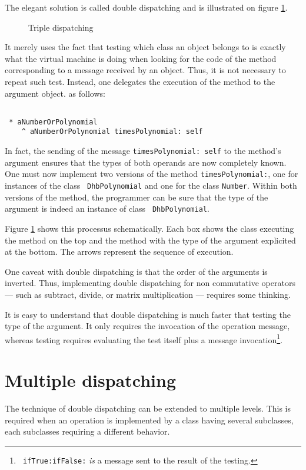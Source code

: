 \documentclass[twoside]{book}
\begin{document}
The elegant solution is called double dispatching and is
illustrated on figure \ref{fig:doubledispatch}.
\begin{figure}
\center{}
\caption{Triple dispatching}\label{fig:doubledispatch}
\end{figure}
It merely uses the fact that testing which class an object belongs
to is exactly what the virtual machine is doing when looking for
the code of the method corresponding to a message received by an
object. Thus, it is not necessary to repeat such test. Instead,
one delegates the execution of the method to the argument object.
as follows:
\begin{codeExample}
\begin{verbatim}

 * aNumberOrPolynomial
    ^ aNumberOrPolynomial timesPolynomial: self
\end{verbatim}
\end{codeExample}
In fact, the sending of the message {\tt timesPolynomial: self} to
the method's argument ensures that the types of both operands are
now completely known. One must now implement two versions of the
method {\tt timesPolynomial:}, one for instances of the class {\tt
DhbPolynomial} and one for the class {\tt Number}. Within both
versions of the method, the programmer can be sure that the type
of the argument is indeed an instance of class {\tt
DhbPolynomial}.

Figure \ref{fig:doubledispatch} shows this processus
schematically. Each box shows the class executing the method on
the top and the method with the type of the argument explicited at
the bottom. The arrows represent the sequence of execution.

One caveat with double dispatching is that the order of the
arguments is inverted. Thus, implementing double dispatching for
non commutative operators --- such as subtract, divide, or matrix
multiplication --- requires some thinking.

It is easy to understand that double dispatching is much faster
that testing the type of the argument. It only requires the
invocation of the operation message, whereas testing requires
evaluating the test itself plus a message invocation\footnote{{\tt
ifTrue:ifFalse:} {\it is} a message sent to the result of the
testing.}.

\section{Multiple dispatching}
\label{sec:multipledisp}The technique of double dispatching can be
extended to multiple levels. This is required when an operation is
implemented by a class having several subclasses, each subclasses
requiring a different behavior.
\end{document}
